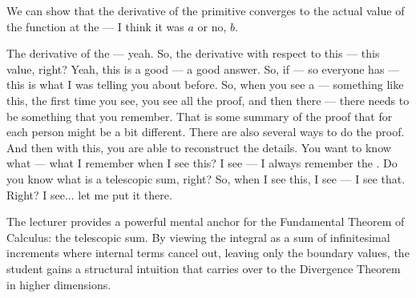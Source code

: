 \begin{student-interaction}
We can show that the derivative of the primitive converges to the actual value of the function at the --- I think it was $a$ or no, $b$.
\end{student-interaction}

\begin{spoken-clean}[continued]
The derivative of the --- yeah. So, the derivative with respect to this --- this value, right? Yeah, this is a good --- a good answer. So, if --- so everyone has --- this is what I was telling you about before. So, when you see a --- something like this, the first time you see, you see all the proof, and then there --- there needs to be something that you remember. That is some summary of the proof that for each person might be a bit different. There are also several ways to do the proof. And then with this, you are able to reconstruct the details. You want to know what --- what I remember when I see this? I see --- I always remember the . Do you know what is a telescopic sum, right? So, when I see this, I see --- I see that. Right? I see... let me put it there.
\end{spoken-clean}

\begin{didactic-insight}
The lecturer provides a powerful mental anchor for the Fundamental Theorem of Calculus: the telescopic sum. By viewing the integral as a sum of infinitesimal increments where internal terms cancel out, leaving only the boundary values, the student gains a structural intuition that carries over to the Divergence Theorem in higher dimensions.
\end{didactic-insight}

